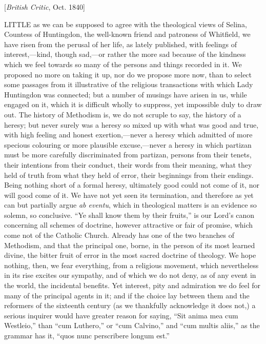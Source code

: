 
[\emph{British Critic}, Oct. 1840]

LITTLE
as we can be supposed to agree with the theological views of Selina,
Countess of Huntingdon, the well-known friend and patroness of
Whitfield, we have risen from the perusal of her life, as lately
published, with feelings of interest,—kind, though sad,—or rather
the more sad because of the kindness which we feel towards so many of
the persons and things recorded in it. We proposed no more on taking
it up, nor do we propose more now, than to select some passages from
it illustrative of the religious transactions with which Lady
Huntingdon was connected; but a number of musings have arisen in us,
while engaged on it, which it is difficult wholly to suppress, yet
impossible duly to draw out. The history of Methodism is, we do not
scruple to say, the history of a heresy; but never surely was a heresy
so mixed up with what was good and true, with high feeling and honest
exertion,—never a heresy which admitted of more specious colouring
or more plausible excuse,—never a heresy in which partizan must be
more carefully discriminated from partizan, persons from their tenets,
their intentions from their conduct, their words from their meaning,
what they held of truth from what they held of error, their beginnings
from their endings. Being nothing short of a formal heresy,
ultimately good could not come of it, nor will good come of it. We
have not yet seen its termination, and therefore as yet can but
partially argue \emph{ab eventu}, which in theological matters is an
evidence so solemn, so conclusive. ``Ye shall know them by their
fruits,'' is our Lord's canon concerning all schemes of doctrine,
however attractive or fair of promise, which come not of the Catholic
Church. Already has one of the two branches of Methodism, and that the
principal one, borne, in the person of its most learned divine, the
bitter fruit of error in the most sacred doctrine of theology. We hope
nothing, then, we fear everything, from a religious movement, which
nevertheless in its rise excites our sympathy, and of which we do not
deny, as of any event in the world, the incidental benefits. Yet
interest, pity and admiration we do feel for many of the principal
agents in it; and if the choice lay between them and the reformers of
the sixteenth century (as we thankfully acknowledge it does not,) a
serious inquirer would have greater reason for saying, ``Sit anima mea
cum Westleio,'' than ``cum Luthero,'' or ``cum Calvino,'' and ``cum multis
aliis,'' as the grammar has it, ``quos nunc perscribere longum est.''


